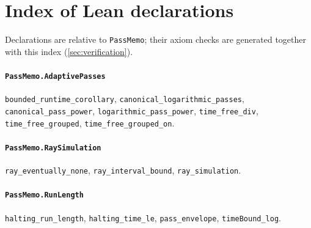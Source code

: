 \section{Index of Lean declarations}\label{sec:leanindex}

Declarations are relative to \texttt{PassMemo}; their axiom checks are generated together with this index (\cref{sec:verification}).

\paragraph{\texttt{PassMemo.AdaptivePasses}}
{\small\raggedright \texttt{bounded\_runtime\_corollary}, \texttt{canonical\_logarithmic\_passes}, \texttt{canonical\_pass\_power}, \texttt{logarithmic\_pass\_power}, \texttt{time\_free\_div}, \texttt{time\_free\_grouped}, \texttt{time\_free\_grouped\_on}.\par}

\paragraph{\texttt{PassMemo.RaySimulation}}
{\small\raggedright \texttt{ray\_eventually\_none}, \texttt{ray\_interval\_bound}, \texttt{ray\_simulation}.\par}

\paragraph{\texttt{PassMemo.RunLength}}
{\small\raggedright \texttt{halting\_run\_length}, \texttt{halting\_time\_le}, \texttt{pass\_envelope}, \texttt{timeBound\_log}.\par}
